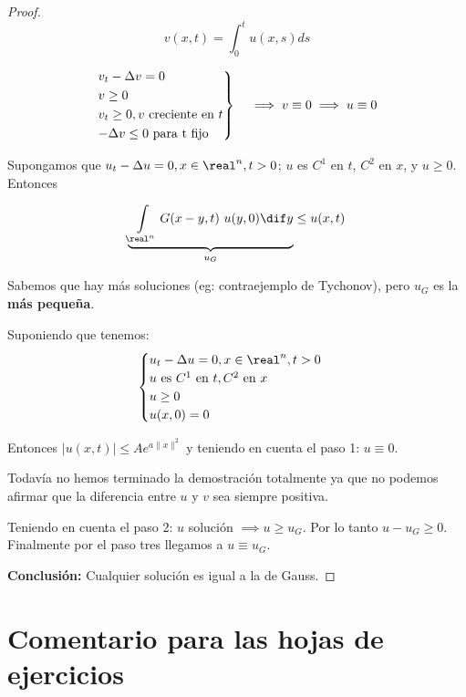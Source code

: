 			\begin{proof}

					\[v(x,t) = \int_0^t u(x,s) ds\]

					\[ \begin{rcases}
						v_t - \Delta v = 0\\
						v \geq 0\\
						v_t \geq 0, v \text{ creciente en } t\\
						-\Delta v \leq 0 \text{ para t fijo}
					\end{rcases} \quad \implies v \equiv 0 \implies u \equiv 0
					\]


					Supongamos que $u_t - \Delta u = 0, x \in \real^n, t > 0$; $u$ es $C^1$ en $t$, $C^2$ en $x$, y $u \geq 0$. Entonces

					\[ \underbrace{\int\limits_{\real^n} G(x-y,t) \ u(y,0) \dif y}_{u_G} \leq u(x,t) \]

					\obs Sabemos que hay más soluciones (eg: contraejemplo de Tychonov), pero $u_G$ es la {\bf más pequeña}.


					Suponiendo que tenemos: \[
					\begin{cases}
						u_t - \Delta u = 0, x \in \real^n, t > 0\\
						u \text{ es } C^1 \text{ en } t, C^2 \text{ en } x\\
						u \geq 0\\
						u(x,0) = 0
					\end{cases}\]

					Entonces $|u(x,t)| \leq A e^{a\|x\|^2}$ y teniendo en cuenta el paso 1: $u \equiv 0$.

				\newpage %

				Todavía no hemos terminado la demostración totalmente ya que no podemos afirmar que la diferencia entre $u$ y $v$ sea siempre positiva.

				Teniendo en cuenta el paso 2: $u$ solución $\implies u \geq u_G$. Por lo tanto $u - u_G \geq 0$. Finalmente por el paso tres llegamos a $u \equiv u_G$.

				{\bf Conclusión:} Cualquier solución es igual a la de Gauss.

			\end{proof}


\section*{Comentario para las hojas de ejercicios}

